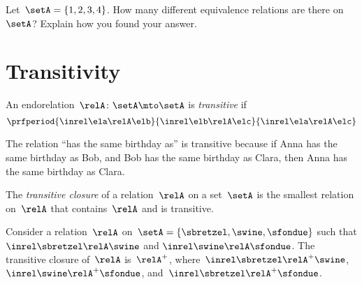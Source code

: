 \vfill
\begin{gradedexercise}
    \label{ex:CountingEquivalenceRelations}
    Let~$\setA = \{ 1, 2, 3, 4 \}$.
    How many different equivalence relations are there on $\setA$?
    Explain how you found your answer.
\end{gradedexercise}


\section{Transitivity}

\begin{ctdefinition}
    \label{def:endo_transitive}
    An endorelation~$\relA\colon \setA\mto \setA$ is \emph{transitive} if
    \begin{equation}
        \prfperiod{
            \inrel \ela \relA \elb
        }{
            \inrel \elb \relA \elc
        }{
            \inrel \ela \relA \elc
        }
    \end{equation}
\end{ctdefinition}

\begin{example}
    The relation ``has the same birthday as'' is transitive because if Anna has the same birthday as Bob, and Bob has the same birthday as Clara, then Anna has the same birthday as Clara.
\end{example}

\begin{ctdefinition}
    \label{def:transitive-closure}
    The \emph{transitive closure} of a relation~$\relA$ on a set~$\setA$ is the smallest relation on~$\relA$ that contains~$\relA$ and is transitive.
\end{ctdefinition}

\begin{example}
    Consider a relation~$\relA$ on~$\setA=\{\sbretzel,\swine,\sfondue\}$ such that $\inrel \sbretzel \relA \swine$ and $\inrel \swine \relA \sfondue$.
    The transitive closure of~$\relA$ is~$\relA^+$, where~$\inrel \sbretzel \relA^+ \swine$, $\inrel \swine \relA^+ \sfondue$, and~$\inrel \sbretzel \relA^+ \sfondue$.
\end{example}
